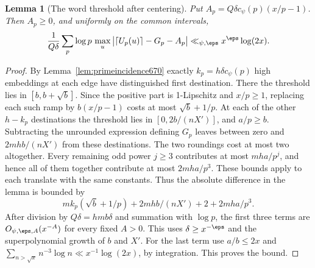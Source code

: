 \documentclass[a4paper,11pt]{article}
\newtheorem{lemma}[proposition]{Lemma}
\theoremstyle{definition}
\theoremstyle{remark}
\numberwithin{equation}{section}
\begin{document}
\begin{lemma}[The word threshold after centering]
\leavevmode\label{lem:residualbaseline673}
Put \(A_p=Q\delta c_\psi(p)(x/p-1)\). Then \(A_p\ge0\), and
uniformly on the common intervals,
\[
 \frac1{Q\delta}\sum_p\log p\,
     \max_u\big|\lceil U_p(u)\rceil-G_p-A_p\big|
            \ll_{\psi,\eps} x^\eps\log(2x).
\]
\end{lemma}
\begin{proof}
By Lemma~\ref{lem:primeincidence670} exactly \(k_p=h\delta
c_\psi(p)\) high embeddings at each edge have distinguished
first destination. There the threshold lies in \([b,b+\sqrt b]\).
Since the positive part is 1-Lipschitz and \(x/p\ge1\), replacing
each such ramp by \(b(x/p-1)\) costs at most \(\sqrt b+1/p\).
At each of the other \(h-k_p\) destinations the threshold lies
in \([0,2b/(nX')]\), and \(a/p\ge b\). Subtracting the
unrounded expression defining \(G_p\) leaves between zero and
\(2mh b/(nX')\) from these destinations. The two roundings cost
at most two altogether. Every remaining odd power \(j\ge3\)
contributes at most \(mha/p^j\), and hence all of them together
contribute at most \(2mha/p^3\). These bounds apply to each
translate with the same constants. Thus the absolute difference
in the lemma is bounded by
\[
       m k_p(\sqrt b+1/p)+2mh b/(nX')+2+2mha/p^3.
\]
After division by \(Q\delta=hmb\delta\) and summation with
\(\log p\), the first three terms are \(O_{\psi,\eps,A}(x^{-A})\)
for every fixed \(A>0\). This uses \(\delta\ge x^{-\eps}\) and
the superpolynomial growth of \(b\) and \(X'\). For the last
term use \(a/b\le2x\) and
\(\sum_{n>\sqrt x}n^{-3}\log n\ll x^{-1}\log(2x)\), by
integration. This proves the bound.
\end{proof}
\end{document}

